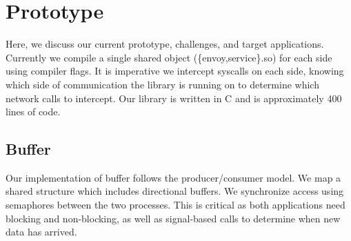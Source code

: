 \section{Prototype}
\label{sec:prototype}
Here, we discuss our current prototype, challenges, and target applications.
Currently we compile a single shared object (\{envoy,service\}.so) for each side using compiler flags.
It is imperative we intercept syscalls on each side, knowing which side of communication the library is running on to determine which network calls to intercept.
Our library is written in C and is approximately 400 lines of code.

\subsection{\sysname Buffer}
Our implementation of \sysname buffer follows the producer/consumer model.
We map a shared structure which includes directional buffers.
We synchronize access using semaphores between the two processes.
This is critical as both applications need blocking and non-blocking, as well as signal-based calls to determine when new data has arrived.

\begin{table}[!ht]
    \begin{center}
        \caption{Library Functions Linked (HTTP/Flask only)}
        \label{t:libraries}
    \end{center}
\end{table}

